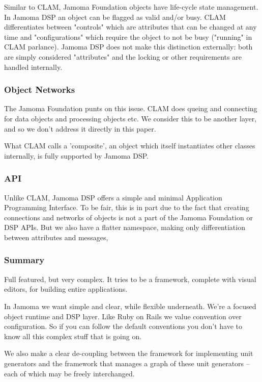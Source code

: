\documentclass[twoside,10pt]{article}
\begin{document}
Similar to CLAM, Jamoma Foundation objects have life-cycle state management.  In Jamoma DSP an object can be flagged as valid and/or busy.  CLAM differentiates between "controls" which are attributes that can be changed at any time and "configurations" which require the object to not be busy ("running" in CLAM parlance).  Jamoma DSP does not make this distinction externally: both are simply considered "attributes" and the locking or other requirements are handled internally. 



\subsubsection{Object Networks}

The Jamoma Foundation punts on this issue.  CLAM does queing and connecting for data objects and processing objects etc.  We consider this to be another layer, and so we don't address it directly in this paper.

What CLAM calls a 'composite', an object which itself instantiates other classes internally, is fully supported by Jamoma DSP.


\subsubsection{API}

Unlike CLAM, Jamoma DSP offers a simple and minimal Application Programming Interface.  To be fair, this is in part due to the fact that creating connections and networks of objects is not a part of the Jamoma Foundation or DSP APIs.  But we also have a flatter namespace, making only differentiation between attributes and messages,


\subsubsection{Summary}

Full featured, but very complex.  It tries to be a framework, complete with visual editors, for building entire applications.

In Jamoma we want simple and clear, while flexible underneath.  We're a focused object runtime and DSP layer.  Like Ruby on Rails we value convention over configuration.  So if you can follow the default conventions you don't have to know all this complex stuff that is going on.

We also make a clear de-coupling between the framework for implementing unit generators and the framework that manages a graph of these unit generators -- each of which may be freely interchanged.
\end{document}
